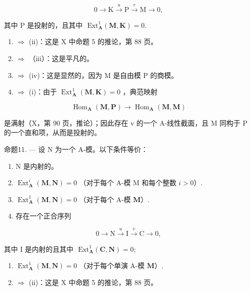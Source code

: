 \[
0 \rightarrow \mathrm{K} \xrightarrow {u} \mathrm{P} \xrightarrow {r} \mathrm{M} \rightarrow 0,
\]

\(\text{其中 P 是投射的，且其中 } \text{ Ext}_{\mathbf{A}}^{1}(\mathbf{M}, \mathbf{K}) = 0.\)

\begin{enumerate}
\def\labelenumi{(\roman{enumi})}
\item
  \(\Rightarrow\) (ii)：这是 X 中命题 5 的推论，第 88 页。
\item
  \(\Rightarrow\) （iii）：这是平凡的。
\item
  \(\Rightarrow\) (iv)：这是显然的，因为 M 是自由模 P 的商模。
\item
  \(\Rightarrow\) (i)：由于 \(\operatorname{Ext}_{\mathbf{A}}^{1}(\mathbf{M},\mathbf{K}) = 0\) ，典范映射
\end{enumerate}

\[
\operatorname{Hom} _ {\mathbf {A}} (\mathbf {M}, \mathbf {P}) \rightarrow \operatorname{Hom} _ {\mathbf {A}} (\mathbf {M}, \mathbf {M})
\]

是满射（X，第 90 页，推论）；因此存在 v 的一个 A-线性截面，且 M 同构于 P 的一个直和项，从而是投射的。

命题11. --- 设 N 为一个 A-模。以下条件等价：

\begin{enumerate}
\def\labelenumi{(\roman{enumi})}
\item
  N 是内射的。
\item
  \(\operatorname{Ext}_{\mathbf{A}}^{i}(\mathbf{M},\mathbf{N}) = 0\) （对于每个 A-模 M 和每个整数 \(i > 0\)）.
\item
  \(\operatorname{Ext}_{\mathbf{A}}^{1}(\mathbf{M},\mathbf{N}) = 0\) （对于每个 A-模 \(\mathbf{M}\)）.
\item
  存在一个正合序列
\end{enumerate}

\[
0 \rightarrow \mathrm{N} \xrightarrow {u} \mathrm{I} \xrightarrow {v} \mathrm{C} \rightarrow 0,
\]

\(\text{其中 I 是内射的且其中 } \text{ Ext}_{\mathbf{A}}^{1} (\mathbf{C}, \mathbf{N}) = 0;\)

\begin{enumerate}
\def\labelenumi{(\alph{enumi})}
\setcounter{enumi}{21}
\item
  \(\operatorname{Ext}_{\mathbf{A}}^{1}(\mathbf{M},\mathbf{N}) = 0\) （对于每个单演 A-模 \(\mathbf{M}\)）.
\item
  \(\Rightarrow\) (ii)：这是 X 中命题 5 的推论，第 88 页。
\end{enumerate}

